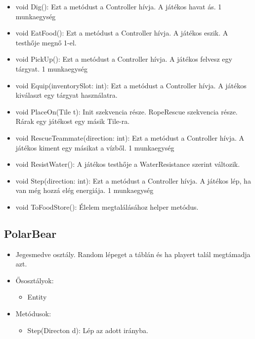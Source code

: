 \begin{itemize}
\begin{itemize}
		\item void Dig(): Ezt a metódust a Controller hívja. A játékos havat ás. 1 munkaegység
		\item void EatFood(): Ezt a metódust a Controller hívja. A játékos eszik. A testhője megnő 1-el.
		\item void PickUp(): Ezt a metódust a Controller hívja. A játékos felvesz egy tárgyat. 1 munkaegység
		\item void Equip(inventorySlot: int): Ezt a metódust a Controller hívja. A játékos kiválaszt egy tárgyat használatra.
		\item void PlaceOn(Tile t): Init szekvencia része. RopeRescue szekvencia része. Rárak egy játékost egy másik Tile-ra.
		\item void RescueTeammate(direction: int): Ezt a metódust a Controller hívja. A játékos kiment egy másikat a vízből. 1 munkaegység
		\item void ResistWater(): A játékos testhője a WaterResistance szerint változik.
		\item void Step(direction: int): Ezt a metódust a Controller hívja. A játékos lép, ha van még hozzá elég energiája. 1 munkaegység
		\item void ToFoodStore(): Élelem megtalálásához helper metódus.
	\end{itemize}
\end{itemize}

\subsection{PolarBear}
\begin{itemize}
	\item Jegesmedve osztály. Random lépeget a táblán és ha playert talál megtámadja azt.
	\item Ősosztályok:
	\begin{itemize}
		\item Entity
	\end{itemize}
	\item Metódusok:
	\begin{itemize}
		\item Step(Directon d): Lép az adott irányba.
	\end{itemize}
\end{itemize}

